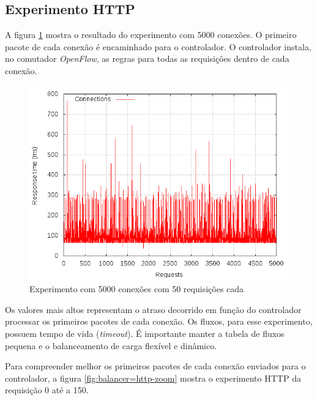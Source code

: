 \subsection{Experimento HTTP}

A figura \ref{fig:balancer-http-full} mostra o resultado do experimento com 
5000 conexões.
O primeiro pacote de cada conexão é encaminhado para o controlador.
O controlador instala, no comutador \emph{OpenFlow}, as regras para todas 
as requisições dentro de cada conexão.

\begin{figure}[htb!]
    \centering
    \includegraphics[width=\linewidth]{img/balancer-http-full}
    \caption{Experimento com 5000 conexões com 50 requisições cada}
    \label{fig:balancer-http-full}
\end{figure}

Os valores mais altos representam o atraso decorrido em função do controlador
processar os primeiros pacotes de cada conexão.
Os fluxos, para esse experimento, possuem tempo de vida (\emph{timeout}).
É importante manter a tabela de fluxos pequena e o balanceamento de carga
flexível e dinâmico.

Para compreender melhor os primeiros pacotes de cada conexão enviados para 
o controlador, a figura \ref{fig:balancer=http-zoom} mostra o experimento 
HTTP da requisição 0 até a 150.

